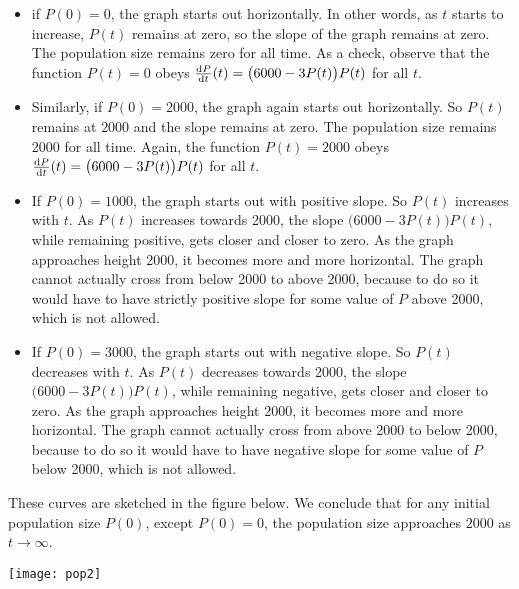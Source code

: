 \begin{itemize}
  \item  if $P(0)=0$, the graph starts out horizontally. In other
    words, as $t$ starts to increase, $P(t)$ remains at zero, so the slope
    of the graph remains at zero. The population
    size remains zero for all time. As a check, observe that
    the function $P(t)=0$ obeys $\diff{P}{t}(t)=\big(6000-3P(t)\big)P(t)$
    for all $t$.

  \item  Similarly, if $P(0)=2000$, the graph again starts out
    horizontally. So $P(t)$ remains at $2000$ and the slope remains at zero.
    The population size remains 2000 for all time. Again, the function
    $P(t)=2000$ obeys $\diff{P}{t}(t)=\big(6000-3P(t)\big)P(t)$ for all $t$.

  \item  If $P(0)=1000$, the graph starts out with positive slope.
    So $P(t)$ increases with $t$. As $P(t)$ increases towards 2000, the slope
    $(6000-3P(t)\big)P(t)$, while remaining positive, gets closer and closer
    to zero. As the graph approaches height 2000, it becomes more and more
    horizontal. The graph cannot actually cross from below 2000 to above 2000,
    because to do so it would have to have strictly positive slope for
    some value of $P$ above 2000, which is not allowed.

  \item  If $P(0)=3000$, the graph starts out with negative slope.
    So $P(t)$ decreases with $t$. As $P(t)$ decreases towards 2000, the slope
    $(6000-3P(t)\big)P(t)$, while remaining negative, gets closer and closer
    to zero. As the graph approaches height 2000, it becomes more and more
    horizontal. The graph cannot actually cross from above 2000 to below 2000,
    because to do so it would have to have negative slope for some value of
    $P$ below 2000, which is not allowed.
\end{itemize}

\noindent These curves are sketched in the figure below. We conclude that
for any initial population size $P(0)$, except $P(0)=0$, the population
size approaches $2000$ as $t\rightarrow\infty$.

\begin{efig}
\begin{center}
   \texttt{[image: pop2]}
\end{center}
\end{efig}

